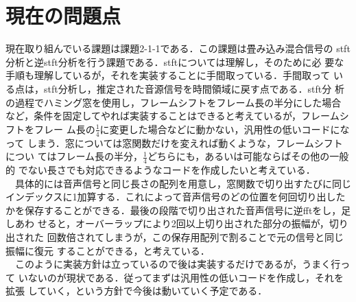 \documentclass[a4j]{jarticle}
\begin{document}
\section*{現在の問題点}
現在取り組んでいる課題は課題2-1-1である．この課題は畳み込み混合信号の
stft分析と逆stft分析を行う課題である．stftについては理解し，そのために必
要な手順も理解しているが，それを実装することに手間取っている．手間取って
いる点は，stft分析し，推定された音源信号を時間領域に戻す点である．stft分
析の過程でハミング窓を使用し，フレームシフトをフレーム長の半分にした場合
など，条件を固定してやれば実装することはできると考えているが，フレームシフトをフレー
ム長の$\frac{1}{4}$に変更した場合などに動かない，汎用性の低いコードになって
しまう．窓については窓関数だけを変えれば動くような，フレームシフトについ
てはフレーム長の半分，$\frac{1}{4}$どちらにも，あるいは可能ならばその他の一般的
でない長さでも対応できるようなコードを作成したいと考えている．\\\ \ 
具体的には音声信号と同じ長さの配列を用意し，窓関数で切り出すたびに同じ
インデックスに1加算する．これによって音声信号のどの位置を何回切り出した
かを保存することができる．最後の段階で切り出された音声信号に逆fftをし，足しあわ
せると，オーバーラップにより2回以上切り出された部分の振幅が，切り出された
回数倍されてしまうが，この保存用配列で割ることで元の信号と同じ振幅に復元
することができる，と考えている．\\ \ \ 
このように実装方針は立っているので後は実装するだけであるが，うまく行って
いないのが現状である．従ってまずは汎用性の低いコードを作成し，それを拡張
していく，という方針で今後は動いていく予定である．
\end{document}
